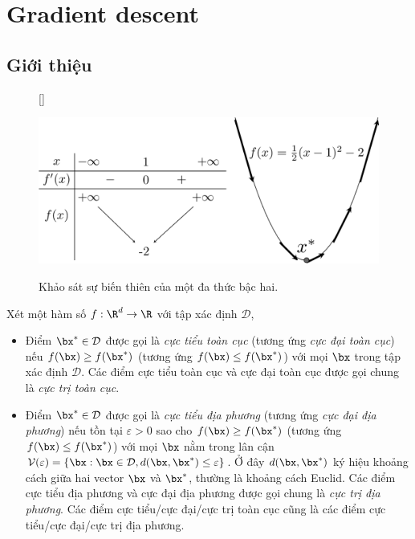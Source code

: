 \chapter{Gradient descent}
\label{cha:gradient_descent}
 
\section{Giới thiệu}
 
\begin{figure}[t]
    [\FBwidth]
    {\caption{ 
    Khảo sát sự biến thiên của một đa thức bậc hai. 
    }
    \label{fig:7_0}}
    { %
    \includegraphics[width=.5\textwidth]{Chapters/04_Gradientdescent/GD/latex/gradient_descent.pdf}
    }
\end{figure}


\def\mcd{\mathcal{D}}
\def\mcv{\mathcal{V}}
Xét một hàm số $f: \R^d \rightarrow \R$ với tập xác định $\mcd$,
\begin{itemize}
    \item Điểm $\bx^* \in \mcd$ được gọi là \textit{cực tiểu toàn cục} (tương ứng \textit{cực đại toàn cục}) nếu $f(\bx) \geq f(\bx^*)$ (tương ứng $f(\bx) \leq f(\bx^*)$) với mọi $\bx$ trong tập xác định $\mcd$. Các điểm cực tiểu toàn cục và cực đại toàn cục được gọi chung là \textit{cực trị toàn cục}.


    \item Điểm $\bx^* \in \mcd$ được gọi là \textit{cực tiểu địa phương} (tương ứng \textit{cực đại địa phương}) nếu tồn tại $\varepsilon > 0$ sao cho $f(\bx) \geq f(\bx^*)$ (tương ứng $f(\bx) \leq f(\bx^*)$) với mọi $\bx$ nằm trong lân cận $\mcv(\varepsilon) = \{\bx: \bx \in \mcd, d(\bx, \bx^*) \leq \varepsilon\}$. Ở đây $d(\bx, \bx^*)$ ký hiệu khoảng cách giữa hai vector $\bx$ và $\bx^*$, thường là khoảng cách Euclid. Các điểm cực tiểu địa phương và cực đại địa phương được gọi chung là \textit{cực trị địa phương}. Các điểm cực tiểu/cực đại/cực trị toàn cục cũng là các điểm cực tiểu/cực đại/cực trị địa phương. 
\end{itemize}



